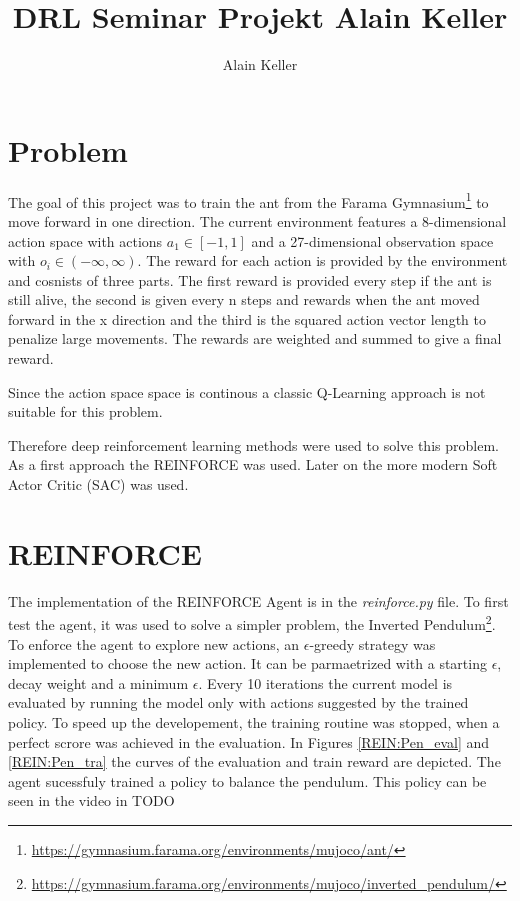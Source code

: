 \documentclass[11pt, a4paper]{article}
\title{DRL Seminar Projekt Alain Keller}
\author{Alain Keller}
\begin{document}
\maketitle
\section{Problem}
The goal of this project was to train the ant from the Farama Gymnasium\footnote{\url{https://gymnasium.farama.org/environments/mujoco/ant/}} to move forward in one direction.
The current environment features a 8-dimensional action space with actions $a_1 \in [-1,1]$ and 
a 27-dimensional observation space with $o_i \in (-\infty, \infty)$.
The reward for each action is provided by the environment and cosnists of three parts.
The first reward is provided every step if the ant is still alive, the second is given every n steps and 
rewards when the ant moved forward in the x direction and the third is the squared action vector length to penalize large movements.
The rewards are weighted and summed to give a final reward.

Since the action space space is continous a classic Q-Learning approach is not suitable for this problem.

Therefore deep reinforcement learning methods were used to solve this problem.
As a first approach the REINFORCE \cite{REINFORCE} was used.
Later on the more modern Soft Actor Critic (SAC) \cite{haarnoja2018soft} was used.
\section{REINFORCE}
The implementation of the REINFORCE Agent is in the \textit{reinforce.py} file.
To first test the agent, it was used to solve a simpler problem, the Inverted Pendulum\footnote{\url{https://gymnasium.farama.org/environments/mujoco/inverted_pendulum/}}.
To enforce the agent to explore new actions, an $\epsilon$-greedy strategy was implemented to choose
the new action. It can be parmaetrized with a starting $\epsilon$, decay weight and a minimum $\epsilon$.
Every 10 iterations the current model is evaluated by running the model only with actions suggested by the trained policy.
To speed up the developement, the training routine was stopped, when a perfect scrore was achieved in the evaluation.
In Figures \ref{REIN:Pen_eval} and \ref{REIN:Pen_tra} the curves of the evaluation and train reward are depicted.
The agent sucessfuly trained a policy to balance the pendulum. This policy can be seen in the video in TODO
\end{document}
